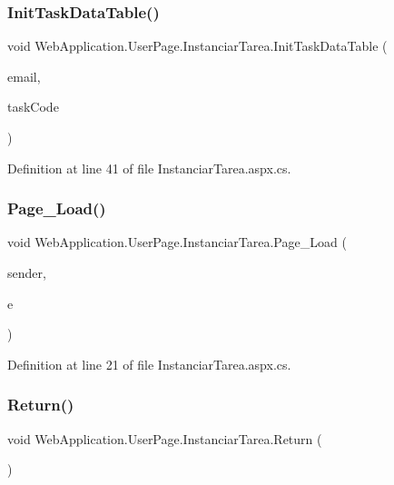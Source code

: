 \subsubsection{\texorpdfstring{InitTaskDataTable()}{InitTaskDataTable()}}
{\footnotesize\ttfamily void Web\+Application.\+User\+Page.\+Instanciar\+Tarea.\+Init\+Task\+Data\+Table (\begin{DoxyParamCaption}\item[{string}]{email,  }\item[{string}]{task\+Code }\end{DoxyParamCaption})\hspace{0.3cm}{\ttfamily [private]}}



Definition at line 41 of file Instanciar\+Tarea.\+aspx.\+cs.

\mbox{\label{classWebApplication_1_1UserPage_1_1InstanciarTarea_afd68741b2820aa5498ccd334a06b77c2}} 
\subsubsection{\texorpdfstring{Page\_Load()}{Page\_Load()}}
{\footnotesize\ttfamily void Web\+Application.\+User\+Page.\+Instanciar\+Tarea.\+Page\+\_\+\+Load (\begin{DoxyParamCaption}\item[{object}]{sender,  }\item[{Event\+Args}]{e }\end{DoxyParamCaption})\hspace{0.3cm}{\ttfamily [protected]}}



Definition at line 21 of file Instanciar\+Tarea.\+aspx.\+cs.

\mbox{\label{classWebApplication_1_1UserPage_1_1InstanciarTarea_a8d982050460e5682b8ddfe2bf77a9053}} 
\subsubsection{\texorpdfstring{Return()}{Return()}}
{\footnotesize\ttfamily void Web\+Application.\+User\+Page.\+Instanciar\+Tarea.\+Return (\begin{DoxyParamCaption}{ }\end{DoxyParamCaption})\hspace{0.3cm}{\ttfamily [private]}}



